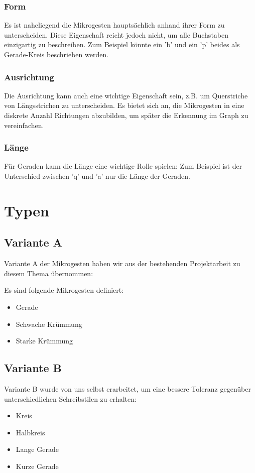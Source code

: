 \subsubsection{Form}
Es ist naheliegend die Mikrogesten hauptsächlich anhand ihrer Form zu unterscheiden. Diese Eigenschaft reicht jedoch nicht, um alle Buchstaben einzigartig zu beschreiben. Zum Beispiel könnte ein 'b' und ein 'p' beides als Gerade-Kreis beschrieben werden. 

\subsubsection{Ausrichtung}
Die Ausrichtung kann auch eine wichtige Eigenschaft sein, z.B. um Querstriche von Längsstrichen zu unterscheiden. Es bietet sich an, die Mikrogesten in eine diskrete Anzahl Richtungen abzubilden, um später die Erkennung im Graph zu vereinfachen.

\subsubsection{Länge}
Für Geraden kann die Länge eine wichtige Rolle spielen: Zum Beispiel ist der Unterschied zwischen 'q' und 'a' nur die Länge der Geraden.  

\section{Typen}
\subsection{Variante A}
Variante A der Mikrogesten haben wir aus der bestehenden Projektarbeit \cite{zeichenerkennung_pa} zu diesem Thema übernommen: 

Es sind folgende Mikrogesten definiert:
\begin{itemize}
\item Gerade
\item Schwache Krümmung
\item Starke Krümmung
\end{itemize}

\subsection{Variante B}
Variante B wurde von uns selbst erarbeitet, um eine bessere Toleranz gegenüber unterschiedlichen Schreibstilen zu erhalten:\begin{itemize}
\item Kreis
\item Halbkreis
\item Lange Gerade
\item Kurze Gerade
\end{itemize}

